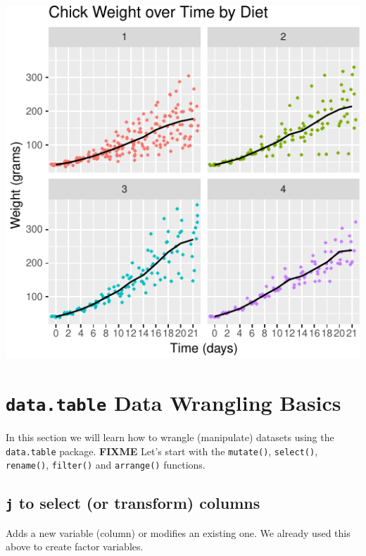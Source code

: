 \documentclass[letterpaperpaper,9pt,twocolumn,twoside,printwatermark=false]{pinp}
\begin{document}
\begin{center}\includegraphics{Getting-Started-in-R_files/figure-latex/finalPlot-1} \end{center}

\hypertarget{data.table-data-wrangling-basics}{%
\section{\texorpdfstring{\texttt{data.table} Data Wrangling
Basics}{data.table Data Wrangling Basics}}\label{data.table-data-wrangling-basics}}

In this section we will learn how to wrangle (manipulate) datasets using
the \texttt{data.table} package. \textbf{FIXME} Let's start with the
\texttt{mutate()}, \texttt{select()}, \texttt{rename()},
\texttt{filter()} and \texttt{arrange()} functions.

\hypertarget{j-to-select-or-transform-columns}{%
\subsection{\texorpdfstring{\texttt{j} to select (or transform)
columns}{j to select (or transform) columns}}\label{j-to-select-or-transform-columns}}

Adds a new variable (column) or modifies an existing one. We already
used this above to create factor variables.
\end{document}
